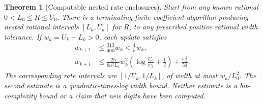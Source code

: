 \documentclass[11pt,letterpaper]{article}
\newtheorem{theorem}{Theorem}[section]
\theoremstyle{remark}\newtheorem{remark}[theorem]{Remark}
\numberwithin{equation}{section}
\begin{document}
\begin{theorem}[Computable nested rate enclosures]\label{ppg:all:thm:rate}
Start from any known rational $0<L_0\le R\le U_0$. There is a terminating finite-coefficient algorithm producing nested rational intervals $[L_k,U_k]$ for $R$, to any prescribed positive rational width tolerance. If $w_k=U_k-L_k>0$, each update satisfies
\begin{align}
 w_{k+1}&\le\frac{313}{400}w_k<\frac45w_k,\label{ppg:all:eq:coarsecontract}\\
 w_{k+1}&\le\frac{25}{8a^2L_0}w_k^2
       \left(\log\frac{U_0}{w_k}+\frac12\right)+\frac{w_k^2}{50}.
 \label{ppg:all:eq:supercontract}
\end{align}
The corresponding rate intervals are $[1/U_k,1/L_k]$, of width at most $w_k/L_0^2$. The second estimate is a quadratic-times-log width bound. Neither estimate is a bit-complexity bound or a claim that new digits have been computed.
\end{theorem}
\end{document}
